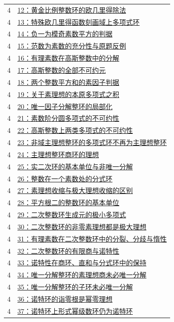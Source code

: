 \documentclass[UTF8,a4paper,11pt,fontset=windows]{ctexart}
\begin{document}
\begin{longtable}{cp{13.5cm}}
4 & \hyperref[ex:4:12]{12：黄金比例整数环的欧几里得除法}\\
4 & \hyperref[ex:4:13]{13：特殊欧几里得函数刻画域上多项式环}\\
4 & \hyperref[ex:4:14]{14：负一为模奇素数平方的判据}\\
4 & \hyperref[ex:4:15]{15：范数为素数的充分性与原题反例}\\
4 & \hyperref[ex:4:16]{16：有理素数在高斯整数中的分解}\\
4 & \hyperref[ex:4:17]{17：高斯整数的全部不可约元}\\
4 & \hyperref[ex:4:18]{18：两个整数平方和的素因子判据}\\
4 & \hyperref[ex:4:19]{19：关于素理想的本原多项式之积}\\
4 & \hyperref[ex:4:20]{20：唯一因子分解整环的局部化}\\
4 & \hyperref[ex:4:21]{21：素数阶分圆多项式的不可约性}\\
4 & \hyperref[ex:4:22]{22：高斯整数上两类多项式的不可约性}\\
4 & \hyperref[ex:4:23]{23：非域主理想整环的多项式环不再为主理想整环}\\
4 & \hyperref[ex:4:24]{24：主理想整环商环的理想}\\
4 & \hyperref[ex:4:25]{25：实二次环的基本单位与非唯一分解}\\
4 & \hyperref[ex:4:26]{26：整数在一个素数处的分式环}\\
4 & \hyperref[ex:4:27]{27：素理想收缩与极大理想收缩的区别}\\
4 & \hyperref[ex:4:28]{28：平方根二的整数环的基本单位}\\
4 & \hyperref[ex:4:29]{29：二次整数环生成元的极小多项式}\\
4 & \hyperref[ex:4:30]{30：二次整数环的非零素理想都是极大理想}\\
4 & \hyperref[ex:4:31]{31：有理素数在二次整数环中的分裂、分歧与惰性}\\
4 & \hyperref[ex:4:32]{32：二次整数环的有限商与诺特性}\\
4 & \hyperref[ex:4:33]{33：诺特性在商环、直和与分式环中的保持}\\
4 & \hyperref[ex:4:34]{34：唯一分解整环的素理想商未必唯一分解}\\
4 & \hyperref[ex:4:35]{35：唯一分解整环的子环未必唯一分解}\\
4 & \hyperref[ex:4:36]{36：诺特环的诣零根是幂零理想}\\
4 & \hyperref[ex:4:37]{37：诺特环上形式幂级数环仍为诺特环}\\
\bottomrule\end{longtable}
\end{document}
